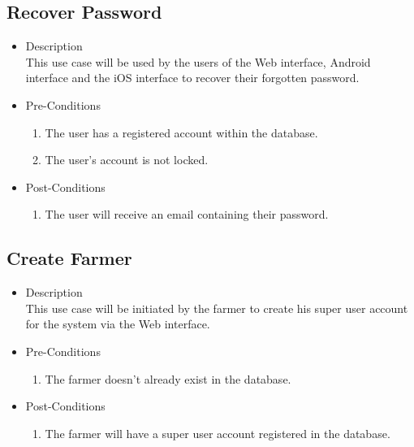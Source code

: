 \documentclass[11pt,fleqn]{book} %
\begin{document}
		\subsection{Recover Password}
			\begin{itemize}
				\item Description\\
				This use case will be used by the users of the Web interface, Android interface and the iOS interface to recover their forgotten password.
				\item Pre-Conditions
				\begin{enumerate}
					\item The user has a registered account within the database.
					\item The user’s account is not locked.
				\end{enumerate}
				\item Post-Conditions
				\begin{enumerate}
					\item The user will receive an email containing their password.
				\end{enumerate}
			\end{itemize}
			
		\subsection{Create Farmer}
			\begin{itemize}
				\item Description\\
				This use case will be initiated by the farmer to create his super user account for the system via the Web interface.
				\item Pre-Conditions
				\begin{enumerate}
					\item The farmer doesn’t already exist in the database.
				\end{enumerate}
				\item Post-Conditions
				\begin{enumerate}
					\item The farmer will have a super user account registered in the database.
				\end{enumerate}
			\end{itemize}
			
\end{document}
